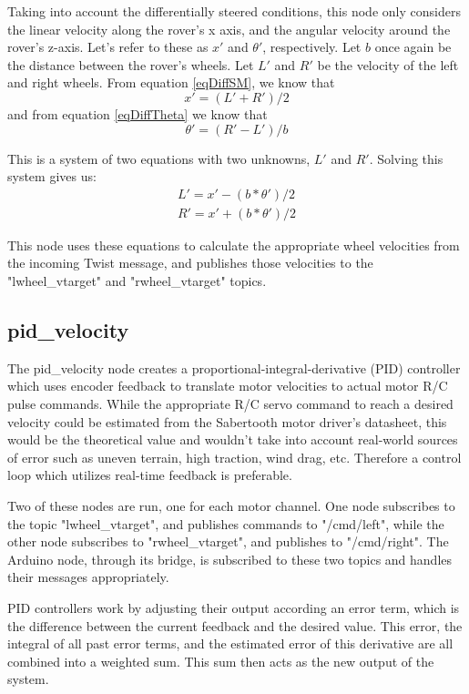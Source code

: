 Taking into account the differentially steered conditions, this node only considers the linear velocity along the rover's x axis, and the angular velocity around the rover's z-axis. Let's refer to these as \(x'\) and \(\theta '\), respectively. Let \(b\) once again be the distance between the rover's wheels. Let \(L'\) and \(R'\) be the velocity of the left and right wheels. From equation \ref{eqDiffSM}, we know that
\begin{equation*}
x' = (L' + R') / 2
\end{equation*}
and from equation \ref{eqDiffTheta} we know that
\begin{equation*}
\theta ' = (R' - L') / b
\end{equation*}

This is a system of two equations with two unknowns, \(L'\) and \(R'\). Solving this system gives us: 
\begin{align*}
L' = x' - (b * \theta ') / 2 \\
R' = x' + (b * \theta ') / 2
\end{align*}

This node uses these equations to calculate the appropriate wheel velocities from the incoming Twist message, and publishes those velocities to the "lwheel\_vtarget" and "rwheel\_vtarget" topics. 

\subsection{pid\_velocity}
The pid\_velocity node creates a  proportional-integral-derivative (PID) controller which uses encoder feedback to translate motor velocities to actual motor R/C pulse commands. While the appropriate R/C servo command to reach a desired velocity could be estimated from the Sabertooth motor driver's datasheet, this would be the theoretical value and wouldn't take into account real-world sources of error such as uneven terrain, high traction, wind drag, etc. Therefore a control loop which utilizes real-time feedback is preferable.

Two of these nodes are run, one for each motor channel. One node subscribes to the topic "lwheel\_vtarget", and publishes commands to "/cmd/left", while the other node subscribes to "rwheel\_vtarget", and publishes to "/cmd/right". The Arduino node, through its bridge, is subscribed to these two topics and handles their messages appropriately.

PID controllers work by adjusting their output according an error term, which is the difference between the current feedback and the desired value. This error, the integral of all past error terms, and the estimated error of this derivative are all combined into a weighted sum. This sum then acts as the new output of the system.

